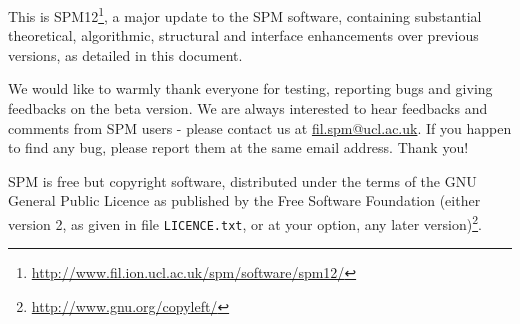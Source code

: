 \documentclass[a4paper,titlepage,openany]{article}
\begin{document}
\let\oldlabel=\label
\renewcommand{\label}[1]{
{\pdfdest name {#1} fit}
\oldlabel{#1}
}

\newlength{\centeroffset}
\setlength{\centeroffset}{-0.5\oddsidemargin}
\addtolength{\centeroffset}{0.5\evensidemargin}
\thispagestyle{empty}
\noindent\hspace*{\centeroffset}

\noindent\hspace*{\centeroffset}

\vspace{10mm}

This is SPM12\footnote{\url{http://www.fil.ion.ucl.ac.uk/spm/software/spm12/}}, a major update to the SPM software, containing substantial theoretical, algorithmic, structural and interface enhancements over previous versions, as detailed in this document.

We would like to warmly thank everyone for testing, reporting bugs and giving feedbacks on the beta version.
We are always interested to hear feedbacks and comments from SPM users - please contact us at \href{mailto:fil.spm@ucl.ac.uk}{fil.spm@ucl.ac.uk}.
If you happen to find any bug, please report them at the same email address. Thank you!

SPM is free but copyright software, distributed under the terms of the GNU General Public Licence as published by the Free Software Foundation (either version 2, as given in file \texttt{LICENCE.txt}, or at your option, any later version)\footnote{\url{http://www.gnu.org/copyleft/}}.
\end{document}

